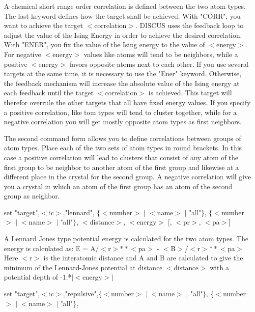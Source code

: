 A chemical short range order correlation is defined 
between the two atom types. 
The last keyword defines how the target shall be achieved. 
With "CORR", you want to achieve the target $ <$correlation$> $. 
DISCUS uses the feedback loop to adjust the value of the 
Ising Energy in order to achieve the desired correlation. 
With "ENER", you fix the value of the Ising energy to the 
value of $ <$energy$> $. For negative $ <$energy$> $ values like atoms 
will tend to be neighbors, while a positive $ <$energy$> $ favors 
opposite atoms next to each other. 
If you use several targets at the same time, it is necessary to 
use the "Ener" keyword. Otherwise, the feedback mechanism will 
increase the absolute value of the Ising energy at each feedback 
until the target $ <$correlation$> $ is achieved. This target will 
therefor overrule the other targets that all have fixed energy 
values. 
If you specify a positive correlation, like tom types will tend to 
cluster together, while for a negative correlation you will get 
mostly opposite atom types as first neighbors. 
\par
The second command form allows you to define correlations between 
groups of atom types. Place each of the two sets of atom types 
in round brackets. In this case a positive correlation will 
lead to clusters that consist of any atom of the first group to be 
neighbor to another atom of the first group and likewise at a 
different place in the crystal for the second group. A negative 
correlation will give you a crystal in which an atom of the first 
group has an atom of the second group as neighbor. 
\par
\par
set "target",$ <$ic$> $,"lennard",  $ \{$$ <$number$> $ $| $ $ <$name$> $ $| $ "all"$\} $, 
                              $ \{$$ <$number$> $ $| $ $ <$name$> $ $| $ "all"$\} $, 
                              $ <$distance$> $,    $ <$energy$> $ [, $ <$pr$> $, $ <$pa$> $] 
\par
A Lennard Jones type potential energy is calculated for the two 
atom types. 
The energy is calculated as: 
E = A/$ <$r$> $$**$$ <$pa$> $ - $ <$B$> $/$ <$r$> $$**$$ <$pa$> $ 
Here $ <$r$> $ is the interatomic distance and 
A and B are calculated to give the minimum of the 
Lennard-Jones potential at distance $ <$distance$> $ with a potential 
depth of -1.*$| $$ <$energy$> $$| $ 
\par
set "target",$ <$ic$> $,"repulsive",$ \{$$ <$number$> $ $| $ $ <$name$> $ $| $ "all"$\} $, 
                              $ \{$$ <$number$> $ $| $ $ <$name$> $ $| $ "all"$\} $, 
